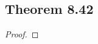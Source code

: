 \documentclass[../../main.tex]{subfiles}
\begin{document}
\subsection{Theorem 8.42}
\begin{wts}

\end{wts}
\begin{proof}

\end{proof}
\end{document}
